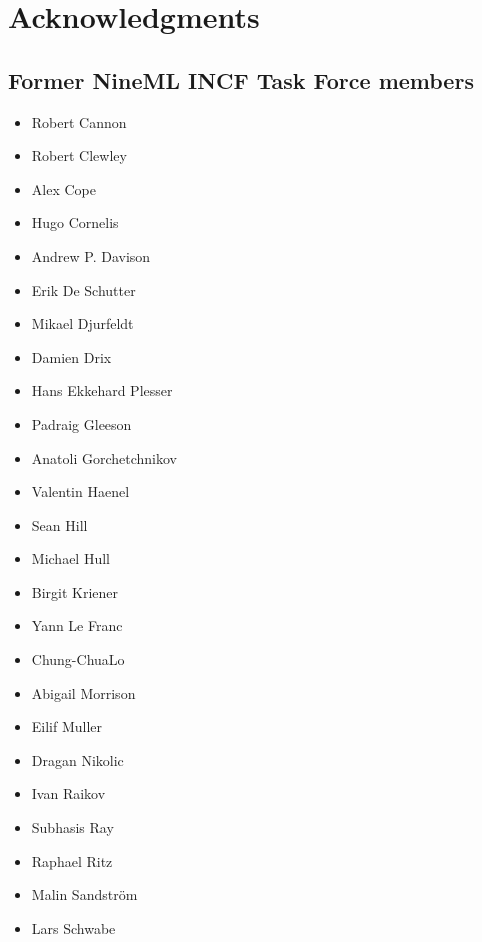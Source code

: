 \documentclass[draftspec]{ninemlspec}
\begin{document}
\section{Acknowledgments}
\subsection{Former NineML INCF Task Force members}
\label{sec:task_force}
\begin{multicols}{2}
\begin{itemize}
\item     Robert    Cannon
\item     Robert    Clewley
\item     Alex      Cope
\item     Hugo      Cornelis
\item     Andrew    P. Davison
\item     Erik      De Schutter
\item     Mikael    Djurfeldt
\item     Damien    Drix
\item     Hans      Ekkehard Plesser
\item     Padraig   Gleeson
\item     Anatoli   Gorchetchnikov
\item     Valentin  Haenel
\item     Sean      Hill
\item     Michael   Hull
\item     Birgit    Kriener
\item     Yann      Le Franc
\item     Chung-ChuaLo
\item     Abigail   Morrison
\item     Eilif     Muller
\item     Dragan    Nikolic
\item     Ivan      Raikov
\item     Subhasis  Ray
\item     Raphael   Ritz
\item     Malin     Sandstr\"{o}m
\item     Lars      Schwabe
\end{itemize}
\end{multicols}

\clearpage


\end{document}
